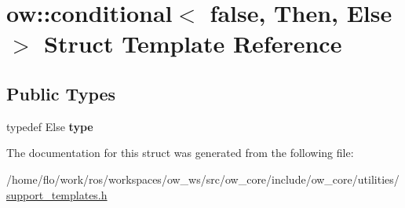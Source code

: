 \hypertarget{structow_1_1conditional_3_01false_00_01Then_00_01Else_01_4}{}\section{ow\+:\+:conditional$<$ false, Then, Else $>$ Struct Template Reference}
\label{structow_1_1conditional_3_01false_00_01Then_00_01Else_01_4}
\subsection*{Public Types}
\begin{DoxyCompactItemize}
\item 
typedef Else {\bfseries type}\hypertarget{structow_1_1conditional_3_01false_00_01Then_00_01Else_01_4_aba1625efe5ff1585eed50ad128eb0ee7}{}\label{structow_1_1conditional_3_01false_00_01Then_00_01Else_01_4_aba1625efe5ff1585eed50ad128eb0ee7}

\end{DoxyCompactItemize}


The documentation for this struct was generated from the following file\+:\begin{DoxyCompactItemize}
\item 
/home/flo/work/ros/workspaces/ow\+\_\+ws/src/ow\+\_\+core/include/ow\+\_\+core/utilities/\hyperlink{support__templates_8h}{support\+\_\+templates.\+h}\end{DoxyCompactItemize}
